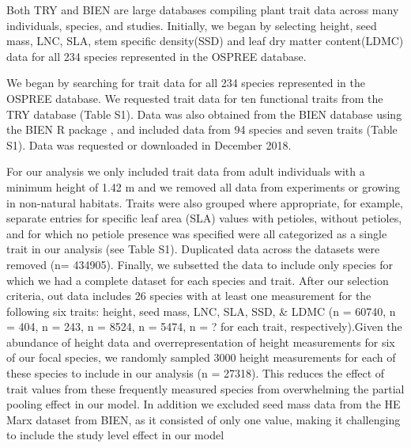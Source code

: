 \documentclass{article}\usepackage[]{graphicx}\usepackage[]{color}
\begin{document}
Both TRY and BIEN are large databases compiling plant trait data across many individuals, species, and studies. Initially, we began by selecting height, seed mass, LNC, SLA, stem specific density(SSD) and leaf dry matter content(LDMC) data for all 234 species represented in the OSPREE database.  


We began by searching for trait data for all 234 species represented in the OSPREE database. We requested trait data for ten functional traits from the TRY database (Table S1). Data was also obtained from the BIEN database using the BIEN R package \citep{Maitner2017}, and included data from 94 species and seven traits (Table S1). Data was requested or downloaded in December 2018. 

For our analysis we only included trait data from adult individuals with a minimum height of 1.42 m and we removed all data from experiments or growing in non-natural habitats. Traits were also grouped where appropriate, for example, separate entries for specific leaf area (SLA) values with petioles, without petioles, and for which no petiole presence was specified were all categorized as a single trait in our analysis (see Table S1). Duplicated data across the datasets were removed (n= 434905). Finally, we subsetted the data to include only species for which we had a complete dataset for each species and trait. After our selection criteria, out data includes 26 species with at least one measurement for the following six traits: height, seed mass, LNC, SLA, SSD, \& LDMC (n = 60740, n = 404, n = 243, n = 8524, n = 5474, n = ? for each trait, respectively).Given the abundance of height data and overrepresentation of height measurements for six of our focal species, we randomly sampled 3000 height measurements for each of these species to include in our analysis (n = 27318). This reduces the effect of trait values from these frequently measured species from overwhelming the partial pooling effect in our model. In addition we excluded seed mass data from the HE Marx dataset from BIEN, as it consisted of only one value, making it challenging to include the study level effect in our model\\ %
\end{document}
